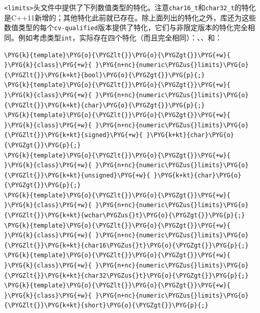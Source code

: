 
\texttt{<\allowbreak{}limits>}头文件中提供了下列数值类型的特化。注意\texttt{char16\_\allowbreak{}t}和\texttt{char32\_\allowbreak{}t}的特化是C++11新增的；其他特化此前就已存在。除上面列出的特化之外，库还为这些数值类型的每个\texttt{cv-\allowbreak{}qualified}版本提供了特化，它们与非限定版本的特化完全相同。例如考虑类型\texttt{int}，实际存在四个特化（而且完全相同）：、、和：



\begin{codeblockbg}
\begin{Verbatim}[commandchars=\\\{\},breaklines=true,breakanywhere=true,fontsize=\codefont,xleftmargin=17bp]
\PYG{k}{template}\PYG{o}{\PYGZlt{}}\PYG{o}{\PYGZgt{}}\PYG{+w}{ }\PYG{k}{class}\PYG{+w}{ }\PYG{n+nc}{numeric\PYGZus{}limits}\PYG{o}{\PYGZlt{}}\PYG{k+kt}{bool}\PYG{o}{\PYGZgt{}}\PYG{p}{;}
\PYG{k}{template}\PYG{o}{\PYGZlt{}}\PYG{o}{\PYGZgt{}}\PYG{+w}{ }\PYG{k}{class}\PYG{+w}{ }\PYG{n+nc}{numeric\PYGZus{}limits}\PYG{o}{\PYGZlt{}}\PYG{k+kt}{char}\PYG{o}{\PYGZgt{}}\PYG{p}{;}
\PYG{k}{template}\PYG{o}{\PYGZlt{}}\PYG{o}{\PYGZgt{}}\PYG{+w}{ }\PYG{k}{class}\PYG{+w}{ }\PYG{n+nc}{numeric\PYGZus{}limits}\PYG{o}{\PYGZlt{}}\PYG{k+kt}{signed}\PYG{+w}{ }\PYG{k+kt}{char}\PYG{o}{\PYGZgt{}}\PYG{p}{;}
\PYG{k}{template}\PYG{o}{\PYGZlt{}}\PYG{o}{\PYGZgt{}}\PYG{+w}{ }\PYG{k}{class}\PYG{+w}{ }\PYG{n+nc}{numeric\PYGZus{}limits}\PYG{o}{\PYGZlt{}}\PYG{k+kt}{unsigned}\PYG{+w}{ }\PYG{k+kt}{char}\PYG{o}{\PYGZgt{}}\PYG{p}{;}
\PYG{k}{template}\PYG{o}{\PYGZlt{}}\PYG{o}{\PYGZgt{}}\PYG{+w}{ }\PYG{k}{class}\PYG{+w}{ }\PYG{n+nc}{numeric\PYGZus{}limits}\PYG{o}{\PYGZlt{}}\PYG{k+kt}{wchar\PYGZus{}t}\PYG{o}{\PYGZgt{}}\PYG{p}{;}
\PYG{k}{template}\PYG{o}{\PYGZlt{}}\PYG{o}{\PYGZgt{}}\PYG{+w}{ }\PYG{k}{class}\PYG{+w}{ }\PYG{n+nc}{numeric\PYGZus{}limits}\PYG{o}{\PYGZlt{}}\PYG{k+kt}{char16\PYGZus{}t}\PYG{o}{\PYGZgt{}}\PYG{p}{;}
\PYG{k}{template}\PYG{o}{\PYGZlt{}}\PYG{o}{\PYGZgt{}}\PYG{+w}{ }\PYG{k}{class}\PYG{+w}{ }\PYG{n+nc}{numeric\PYGZus{}limits}\PYG{o}{\PYGZlt{}}\PYG{k+kt}{char32\PYGZus{}t}\PYG{o}{\PYGZgt{}}\PYG{p}{;}
\PYG{k}{template}\PYG{o}{\PYGZlt{}}\PYG{o}{\PYGZgt{}}\PYG{+w}{ }\PYG{k}{class}\PYG{+w}{ }\PYG{n+nc}{numeric\PYGZus{}limits}\PYG{o}{\PYGZlt{}}\PYG{k+kt}{short}\PYG{o}{\PYGZgt{}}\PYG{p}{;}

\end{Verbatim}
\end{codeblockbg}
